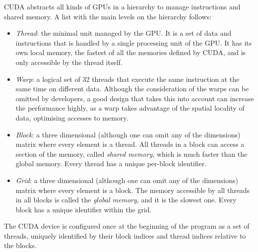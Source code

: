 \ac{CUDA} abstracts all kinds of \acp{GPU} in a hierarchy to manage instructions and shared memory. A list with the main levels on the hierarchy follows:
\begin{itemize}
	\item \emph{Thread}: the minimal unit managed by the \ac{GPU}. It is a set of data and instructions that is handled by a single processing unit of the \ac{GPU}. It has its own local memory, the fastest of all the memories defined by \ac{CUDA}, and is only accessible by the thread itself.
	\item \emph{Warp}: a logical set of 32 threads that execute the same instruction at the same time on different data. Although the consideration of the warps can be omitted by developers, a good design that takes this into account can increase the performance highly, as a warp takes advantage of the spatial locality of data, optimising accesses to memory.
	\item \emph{Block}: a three dimensional (although one can omit any of the dimensions) matrix where every element is a thread. All threads in a block can access a section of the memory, called \emph{shared memory}, which is much faster than the global memory. Every thread has a unique per-block identifier.
	\item \emph{Grid}: a three dimensional (although one can omit any of the dimensions) matrix where every element is a block. The memory accessible by all threads in all blocks is called the \emph{global memory}, and it is the slowest one. Every block has a unique identifier within the grid.
\end{itemize}

The \ac{CUDA} device is configured once at the beginning of the program as a set of threads, uniquely identified by their block indices and thread indices relative to the blocks.

